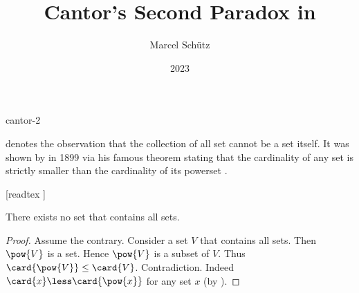 \documentclass{stex}
\begin{document}
\title{Cantor's Second Paradox in \Naproche}
\author{Marcel Schütz}
\date{2023}
\maketitle
\begin{smodule}{cantor-2}
\begin{sparagraph}
  \noindent \emph{} denotes the observation that the collection of all set cannot be a set itself.
  It was shown by  in 1899 via his famous theorem stating that the cardinality of any set is strictly smaller than the cardinality of its powerset \cite[chapter 163]{Cantor1991}.
\end{sparagraph}

\begin{forthel}
  [readtex ]

  \begin{theorem*}\label{cantor_paradox_2}
    There exists no set that contains all sets.
  \end{theorem*}
  \begin{proof}
    Assume the contrary.
    Consider a set $V$ that contains all sets.
    Then $\pow{V}$ is a set.
    Hence $\pow{V}$ is a subset of $V$.
    Thus $\card{\pow{V}} \leq \card{V}$.
    Contradiction.
    Indeed $\card{x} \less \card{\pow{x}}$ for any set $x$ (by ).
  \end{proof}
\end{forthel}
\end{smodule}
\printbibliography
\end{document}
